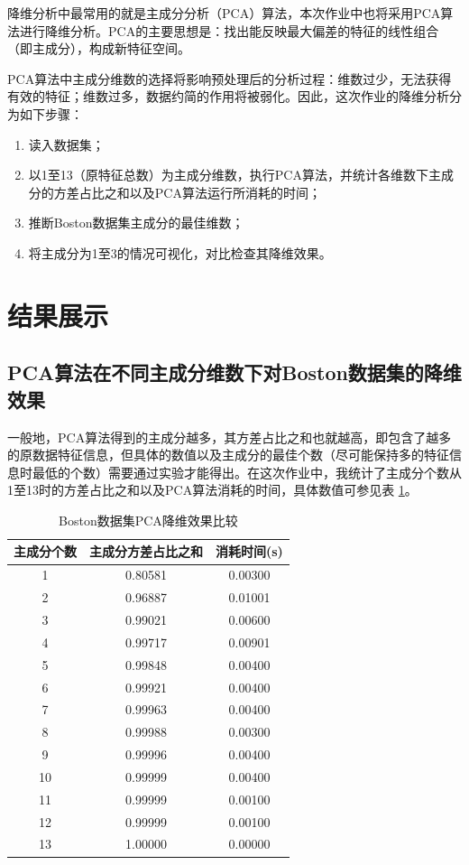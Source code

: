 \documentclass[12pt,a4paper]{article}
\theoremstyle{definition}
\begin{document}
降维分析中最常用的就是主成分分析（PCA）算法，本次作业中也将采用PCA算法进行降维分析。PCA的主要思想是：找出能反映最大偏差的特征的线性组合（即主成分），构成新特征空间。

PCA算法中主成分维数的选择将影响预处理后的分析过程：维数过少，无法获得有效的特征；维数过多，数据约简的作用将被弱化。因此，这次作业的降维分析分为如下步骤：

\begin{enumerate}
	\item 读入数据集；
	\item 以1至13（原特征总数）为主成分维数，执行PCA算法，并统计各维数下主成分的方差占比之和以及PCA算法运行所消耗的时间；
	\item 推断Boston数据集主成分的最佳维数；
	\item 将主成分为1至3的情况可视化，对比检查其降维效果。
\end{enumerate}

\section{结果展示}

\subsection{PCA算法在不同主成分维数下对Boston数据集的降维效果}
\label{sec:pca_res_com}

一般地，PCA算法得到的主成分越多，其方差占比之和也就越高，即包含了越多的原数据特征信息，但具体的数值以及主成分的最佳个数（尽可能保持多的特征信息时最低的个数）需要通过实验才能得出。在这次作业中，我统计了主成分个数从1至13时的方差占比之和以及PCA算法消耗的时间，具体数值可参见表 \ref{tab:pca_res_com}。

\begin{table}[H]
	\renewcommand\arraystretch{1.35}
	\caption{Boston数据集PCA降维效果比较}
	\label{tab:pca_res_com}
	\centering
	
	\begin{tabular}{c|c|c}
		\centering
		主成分个数 &   主成分方差占比之和 & 消耗时间(s) \\
		\hline
		1 & 0.80581 & 0.00300 \\
		2 & 0.96887 & 0.01001 \\
		3 & 0.99021 & 0.00600 \\
		4 & 0.99717 & 0.00901 \\
		5 & 0.99848 & 0.00400 \\
		6 & 0.99921 & 0.00400 \\
		7 & 0.99963 & 0.00400 \\
		8 & 0.99988 & 0.00300 \\
		9 & 0.99996 & 0.00400 \\
		10 & 0.99999 & 0.00400 \\
		11 & 0.99999 & 0.00100 \\
		12 & 0.99999 & 0.00100 \\
		13 & 1.00000 & 0.00000 \\
	\end{tabular}
\end{table}
\end{document}
